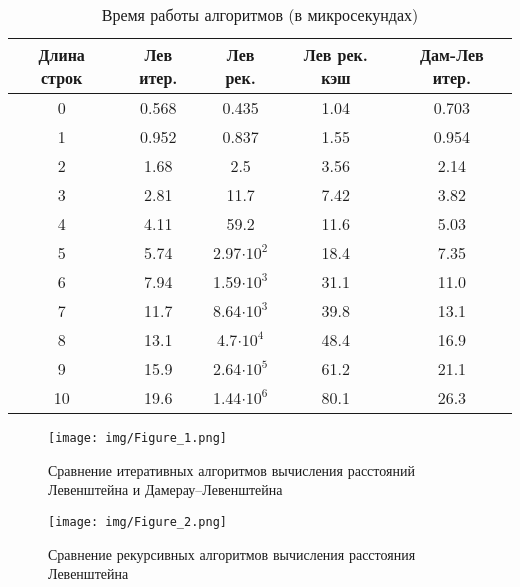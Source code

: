 \documentclass[a4paper,14pt, unknownkeysallowed]{extreport}
\begin{document}
\begin{table}[h]
	\begin{center}
		\begin{threeparttable}
		\captionsetup{justification=raggedright,singlelinecheck=off}
		\caption{Время работы алгоритмов (в микросекундах)}
		\label{tbl:time_measurements}
		\begin{tabular}{|c|c|c|c|c|}
			\hline
			Длина строк &  Лев итер.  & Лев рек. & Лев рек. кэш & Дам-Лев итер. \\
                \hline
			0    & 0.568 &   0.435 &    1.04 &   0.703 \\
			\hline
			1    & 0.952 &   0.837 &    1.55 &   0.954 \\ 
			\hline
			2    & 1.68 &     2.5 &    3.56 &    2.14 \\ 
			\hline
			3    & 2.81 &    11.7 &    7.42 &    3.82 \\ 
			\hline
			4    & 4.11 &    59.2 &    11.6 &    5.03 \\ 
			\hline
			5    & 5.74 & 2.97$\cdot 10^{2}$ &    18.4 &    7.35 \\ 
			\hline
			6    & 7.94 & 1.59$\cdot 10^{3}$ &    31.1 &    11.0 \\ 
			\hline
			7    & 11.7 & 8.64$\cdot 10^{3}$ &    39.8 &    13.1 \\ 
			\hline
			8    & 13.1 & 4.7$\cdot 10^{4}$ &    48.4 &    16.9 \\ 
                \hline
                9    & 15.9 & 2.64$\cdot 10^{5}$ &    61.2 &    21.1 \\
                \hline
                10    & 19.6 & 1.44$\cdot 10^{6}$ &    80.1 &    26.3 \\
   
			\hline
		\end{tabular}
		\end{threeparttable}
    \end{center}
\end{table}


\begin{figure}[h]
	\centering
	\texttt{[image: img/Figure\_1.png]}
	\caption{Сравнение итеративных алгоритмов вычисления расстояний Левенштейна и Дамерау--Левенштейна}
	\label{fig:DL_table}
\end{figure}

\begin{figure}[h]
	\centering
	\texttt{[image: img/Figure\_2.png]}
	\caption{Сравнение рекурсивных алгоритмов вычисления расстояния Левенштейна}
	\label{fig:DL_table}
\end{figure}
\end{document}
